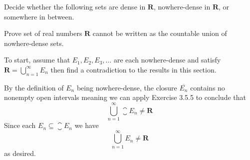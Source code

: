 \begin{exercise}
  Decide whether the following sets are dense in $\mathbf{R}$, nowhere-dense in $\mathbf{R}$, or somewhere in between.
\end{exercise}

\begin{solution}
\end{solution}

\begin{exercise}
  Prove set of real numbers $\mathbf{R}$ cannot be written as the countable union of nowhere-dense sets.

  To start, assume that $E_{1}, E_{2}, E_{3}, \ldots$ are each nowhere-dense and satisfy $\mathbf{R}=\bigcup_{n=1}^{\infty} E_{n}$ then find a contradiction to the results in this section.
\end{exercise}

\begin{solution}
  By the definition of $E_n$ being nowhere-dense, the closure $\overline{E_n}$ contains no nonempty open intervals meaning we can apply Exercise 3.5.5 to conclude that
  $$
  \bigcup_{n=1}^\infty \closure{E_n} \ne \mathbf{R}
  $$
  Since each $E_n \subseteq \closure{E_n}$ we have
  $$
  \bigcup_{n=1}^\infty E_n \ne \mathbf{R}
  $$
  as desired.
\end{solution}
